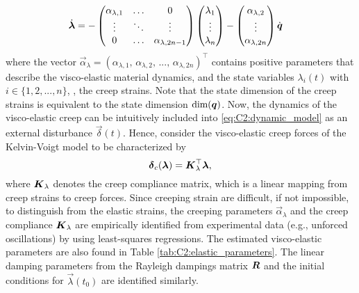  \begin{align}
\dot{\boldsymbol{\lambda}} & = -\begin{pmatrix} \alpha_{\lambda,1} & \hdots & 0 \\
\vdots & \ddots & \vdots  \\ 0 & \hdots & \alpha_{\lambda,2n-1} \end{pmatrix} \begin{pmatrix} \lambda_1 \\ \vdots \\ \lambda_n \end{pmatrix} -\begin{pmatrix} \alpha_{\lambda,2} \\ \vdots \\ \alpha_{\lambda,2n} \end{pmatrix} {\dot{\boldsymbol{q}}}
  \end{align}
%
\noindent where the vector $\vec{\alpha}_\lambda = (\alpha_{\lambda,1},\,\alpha_{\lambda,2},\,...,\,\alpha_{\lambda,2n})^\top$ contains positive parameters that describe the visco-elastic material dynamics, and the state variables $\lambda_i(t)$ with $i \in \{1,2,...,n\}$,  \ie, the creep strains. Note that the state dimension of the creep strains is equivalent to the state dimension $\text{dim}({\boldsymbol{q}})$. Now, the dynamics of the visco-elastic creep can be intuitively included into
\eqref{eq:C2:dynamic_model} as an external disturbance $\vec{\delta}(t)$. Hence, consider the visco-elastic creep forces of the Kelvin-Voigt model to be characterized by
%
\begin{equation}
\boldsymbol{\delta}_c({\boldsymbol{\lambda}}) = \boldsymbol{K}_{\lambda}^\top \boldsymbol{\lambda},
\end{equation}
%
\noindent where $\boldsymbol{K}_\lambda$ denotes the creep compliance matrix, which is a linear mapping from creep strains to creep forces. Since creeping strain are difficult, if not impossible, to distinguish from the elastic strains, the creeping parameters $\vec{\alpha}_\lambda$ and the creep compliance $\boldsymbol{K}_\lambda$ are empirically identified from experimental data (e.g., unforced oscillations) by using least-squares regressions. The estimated visco-elastic parameters are also found in Table \ref{tab:C2:elastic_parameters}. The linear damping parameters from the Rayleigh dampings matrix $\boldsymbol{R}$ and the initial conditions for $\vec{\lambda}(t_0)$ are identified similarly.

